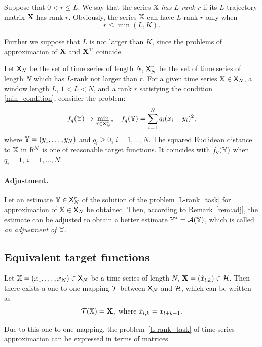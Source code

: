 \documentclass[sii]{ipart}
\begin{document}
Suppose that $0 < r \le L$. We say that the series $\mathbb{X}$ \emph{has $L$-rank $r$} if its $L$-trajectory matrix $\mathbf{X}$ has rank $r$.
Obviously, the series $\mathbb{X}$ can have $L$-rank $r$ only when
\begin{equation}
r \le \min(L, K). \label{min_condition}
\end{equation}

Further we suppose that $L$ is not larger than $K$, since the problems of approximation of $\mathbf{X}$ and $\mathbf{X}^{\mathrm{T}}$ coincide.

Let $\mathsf{X}_N$ be the set of time series of length $N$, $\mathsf{X}_N^r$ be the set of time series of length $N$ which has $L$-rank not larger than $r$. For a given time series $\mathbb{X} \in \mathsf{X}_N$, a window length $L$, $1 < L < N$, and a rank $r$ satisfying the condition \eqref{min_condition}, consider the problem:
\begin{equation} \label{L-rank_task}
f_q(\tsY) \to \min_{\tsY \in \sfX_N^r}, \quad f_q(\tsY) = \sum \limits_{i=1}^N q_i(x_i - y_i)^2,
\end{equation}
where $\mathbb{Y} = (y_1, \ldots, y_N)$ and
$q_i \ge 0$, $i = 1, \ldots, N$. The squared Euclidean distance to $\mathbb{X}$ in $\mathsf{R}^N$ is one of reasonable target functions. It coincides with $f_q(\mathbb{Y})$ when $q_i = 1$, $i = 1, \ldots, N$.

\paragraph*{Adjustment.} Let an estimate $\mathbb{Y} \in \mathsf{X}_N^r$ of the solution of the problem \eqref{L-rank_task} for approximation of $\mathbb{X} \in \mathsf{X}_N$ be obtained. Then, according to Remark~\ref{rem:adj}, the estimate can be adjusted to obtain a better estimate $\mathbb{Y}^*=\mathcal{A}(\mathbb{Y})$, which is called \emph{an adjustment of $\mathbb{Y}$}.

\subsection{Equivalent target functions}

Let $\mathbb{X} = (x_1, \ldots, x_N) \in \mathsf{X}_N$ be a time series of length $N$, $\mathbf{X} = (\hat x_{l,k}) \in \mathcal{H}$. Then there exists a one-to-one mapping $\mathcal{T}$ between $\mathsf{X}_N$ and $\mathcal{H}$, which can be written as
\begin{equation*}
\calT(\tsX) = \bfX,\ \text{where} \ \hat x_{l, k} = x_{l + k - 1}.
\end{equation*}

Due to this one-to-one mapping, the problem~\eqref{L-rank_task} of time series approximation can be expressed in terms of matrices.
\end{document}
